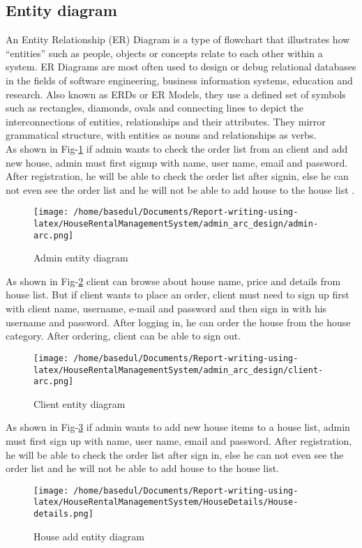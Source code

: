 \documentclass[12pt,a4paper]{report}
\newcommand\tab[1][0cm]{\hspace*{#1}}
\begin{document}
	\subsection{Entity diagram}
	\tab An Entity Relationship (ER) Diagram \cite{Ref:13} is a type of flowchart that illustrates how “entities” such as people, objects or concepts relate to each other within a system. ER Diagrams are most often used to design or debug relational databases in the fields of software engineering, business information systems, education and research. Also known as ERDs or ER Models, they use a defined set of symbols such as rectangles, diamonds, ovals and connecting lines to depict the interconnections of entities, relationships and their attributes. They mirror grammatical structure, with entities as nouns and relationships as verbs.\\
As shown in Fig-\ref{fig:adminreg} if admin wants to check the order list from an client and add new house, admin must first signup with name, user name, email and password. After registration, he will be able to check the order list after signin, else he can not even see the order list and he will not be able to add house to the house list . 
	\begin{figure}[H]
		\centering
		\texttt{[image: /home/basedul/Documents/Report-writing-using-latex/HouseRentalManagementSystem/admin\_arc\_design/admin-arc.png]}
		\caption{\hspace{0.35em}Admin entity diagram}
		\label{fig:adminreg} 
	\end{figure}{As shown in Fig-\ref{fig:clientreg} client can browse about house name, price and details from house list. But if client wants to place an order, client must need to sign up first with client name, username, e-mail and password and then sign in with his username and password. After logging in, he can order the house from the house category. After ordering, client can be able to sign out.}
	\begin{figure}[H]
		\centering
		\texttt{[image: /home/basedul/Documents/Report-writing-using-latex/HouseRentalManagementSystem/admin\_arc\_design/client-arc.png]}
		\caption{\hspace{0.35em}Client entity diagram}
		\label{fig:clientreg} 
	\end{figure}
	{As shown in Fig-\ref{fig:houseadd} if admin wants to add new house items to a house list, admin must first sign up with name, user name, email and password. After registration, he will be able to check the order list after sign in, else he can not even see the order list and he will not be able to add house to the house list.}
	\begin{figure}[H]
		\centering
		\texttt{[image: /home/basedul/Documents/Report-writing-using-latex/HouseRentalManagementSystem/HouseDetails/House-details.png]}
		\caption{\hspace{0.35em}House add entity diagram}
		\label{fig:houseadd} 
	\end{figure}
	
\end{document}
